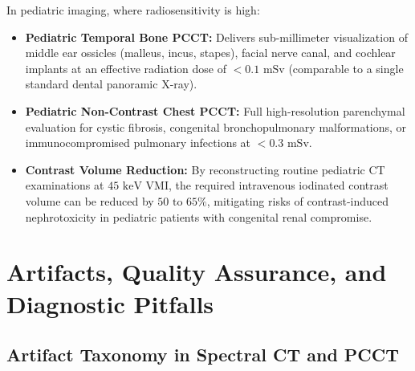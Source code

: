 \documentclass[11pt,a4paper]{article}
\begin{document}
\begin{protocolbox}
In pediatric imaging, where radiosensitivity is high:
\begin{itemize}[leftmargin=1.5em]
    \item \textbf{Pediatric Temporal Bone PCCT:} Delivers sub-millimeter visualization of middle ear ossicles (malleus, incus, stapes), facial nerve canal, and cochlear implants at an effective radiation dose of \textbf{$< 0.1\text{ mSv}$} (comparable to a single standard dental panoramic X-ray).
    \item \textbf{Pediatric Non-Contrast Chest PCCT:} Full high-resolution parenchymal evaluation for cystic fibrosis, congenital bronchopulmonary malformations, or immunocompromised pulmonary infections at \textbf{$< 0.3\text{ mSv}$}.
    \item \textbf{Contrast Volume Reduction:} By reconstructing routine pediatric CT examinations at $45\text{ keV}$ VMI, the required intravenous iodinated contrast volume can be reduced by \textbf{$50\text{ to }65\%$}, mitigating risks of contrast-induced nephrotoxicity in pediatric patients with congenital renal compromise.
\end{itemize}
\end{protocolbox}

\section{Artifacts, Quality Assurance, and Diagnostic Pitfalls}

\subsection{Artifact Taxonomy in Spectral CT and PCCT}
\end{document}
